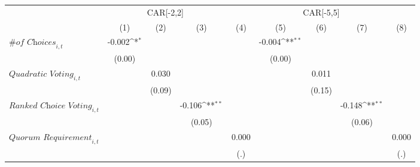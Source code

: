 {
\def\sym#1{\ifmmode^{#1}\else\(^{#1}\)\fi}
\begin{tabular}{l*{8}{c}}
\toprule
                    &\multicolumn{3}{c}{CAR[-2,2]}                                    &\multicolumn{5}{c}{CAR[-5,5]}                                                                                \\\cmidrule(lr){2-4}\cmidrule(lr){5-9}
                    &\multicolumn{1}{c}{(1)}         &\multicolumn{1}{c}{(2)}         &\multicolumn{1}{c}{(3)}         &\multicolumn{1}{c}{(4)}         &\multicolumn{1}{c}{(5)}         &\multicolumn{1}{c}{(6)}         &\multicolumn{1}{c}{(7)}         &\multicolumn{1}{c}{(8)}         \\
\midrule
$\textit{\# of Choices}_{i,t}$&      -0.002\sym{*}  &                     &                     &                     &      -0.004\sym{**} &                     &                     &                     \\
                    &      (0.00)         &                     &                     &                     &      (0.00)         &                     &                     &                     \\
$\textit{Quadratic Voting}_{i,t}$&                     &       0.030         &                     &                     &                     &       0.011         &                     &                     \\
                    &                     &      (0.09)         &                     &                     &                     &      (0.15)         &                     &                     \\
$\textit{Ranked Choice Voting}_{i,t}$&                     &                     &      -0.106\sym{**} &                     &                     &                     &      -0.148\sym{**} &                     \\
                    &                     &                     &      (0.05)         &                     &                     &                     &      (0.06)         &                     \\
$\textit{Quorum Requirement}_{i,t}$&                     &                     &                     &       0.000         &                     &                     &                     &       0.000         \\
                    &                     &                     &                     &         (.)         &                     &                     &                     &         (.)         \\

\end{tabular}}
